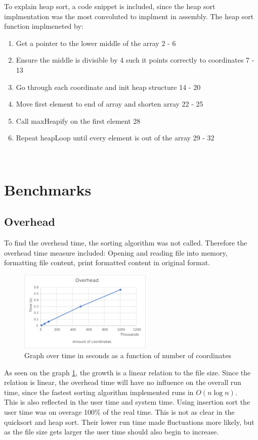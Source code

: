 \documentclass[12pt, a4paper]{article}
\begin{document}
			\begin{minipage}{0.4\textwidth}
				
			\end{minipage}
			\begin{minipage}{0.6\textwidth}
				To explain heap sort, a code snippet is included, since the heap sort implmentation was the most convoluted to implment in assembly. The heap sort function implmeneted by:
				\begin{enumerate}
					\item Get a pointer to the lower middle of the array 2 - 6
					\item Ensure the middle is divisible by 4 such it points correctly to coordinates 7 - 13
					\item Go through each coordinate and init heap structure 14 - 20
					\item Move first element to end of array and shorten array 22 - 25
					\item Call maxHeapify on the first element 28
					\item Repeat heapLoop until every element is out of the array 29 - 32
				\end{enumerate}
 			\end{minipage}\\
			\section{Benchmarks}
		\subsection{Overhead}
			To find the overhead time, the sorting algorithm was not called. Therefore the overhead time measure included: Opening and reading file into memory, formatting file content, print formatted content in original format.
				\begin{figure}[h]
						  \centering
						  \includegraphics[width=240px]{assets/overhead.eps}
						  \caption{Graph over time in seconds as a function of number of coordinates}
							\label{fig:overhead}
				\end{figure}	
				As seen on the graph \ref{fig:overhead}, the growth is a linear relation to the file size. Since the relation is linear, the overhead time will have no influence on the overall run time, since the fastest sorting algorithm implemented runs in $O(n\log n)$.\\
			This is also reflected in the user time and system time. Using insertion sort the user time was on overage 100\% of the real time.
			This is not as clear in the quicksort and heap sort. Their lower run time made fluctuations more likely, but as the file size gets larger the user time should also begin to increase.
\end{document}
